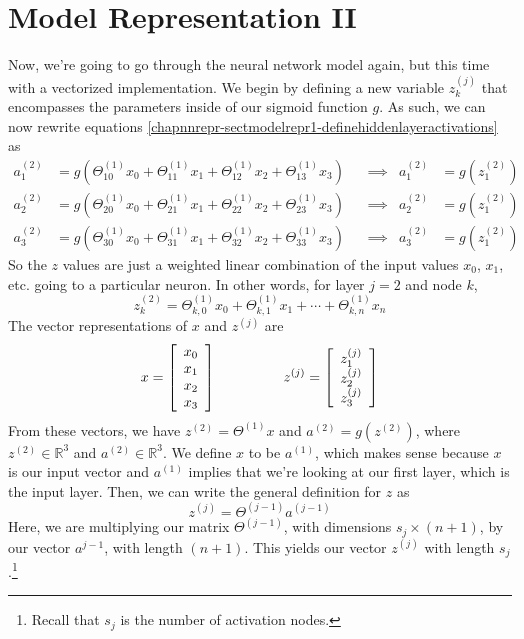 \section{Model Representation II}
Now, we're going to go through the neural network model again, but this time with a vectorized implementation. We begin by defining a new variable $z_k^{(j)}$ that encompasses the parameters inside of our sigmoid function $g$. As such, we can now rewrite equations \ref{chapnnrepr-sectmodelrepr1-definehiddenlayeractivations} as
\begin{align*}
a_1^{(2)} &= g\left(	\Theta_{10}^{(1)} x_0 + \Theta_{11}^{(1)} x_1 + \Theta_{12}^{(1)} x_2 + \Theta_{13}^{(1)} x_3   	\right) & &\implies &  a_1^{(2)} &= g\left(z_1^{(2)}\right) \\
a_2^{(2)} &= g\left(	\Theta_{20}^{(1)} x_0 + \Theta_{21}^{(1)} x_1 + \Theta_{22}^{(1)} x_2 + \Theta_{23}^{(1)} x_3   	\right) & &\implies &  a_2^{(2)} &= g\left(z_1^{(2)}\right) \\
a_3^{(2)} &= g\left(	\Theta_{30}^{(1)} x_0 + \Theta_{31}^{(1)} x_1 + \Theta_{32}^{(1)} x_2 + \Theta_{33}^{(1)} x_3   	\right) & &\implies &  a_3^{(2)} &= g\left(z_1^{(2)}\right)
\end{align*}
So the $z$ values are just a weighted linear combination of the input values $x_0$, $x_1$, etc. going to a particular neuron. In other words, for layer $j=2$ and node $k$, 
\begin{equation}
z_k^{(2)} = \Theta_{k, 0}^{(1)} x_0 + \Theta_{k, 1}^{(1)} x_1 + \cdots + \Theta_{k, n}^{(1)} x_n
\end{equation}
The vector representations of $x$ and $z^{(j)}$ are
$$
x = \left[\begin{array}{c} x_0 \\ x_1 \\ x_2 \\ x_3 \end{array}\right] ~~\mbox{ \;\;\;\;\;\;\;\;\;\; }~~ z^{(j)} = \left[\begin{array}{c} z_1^{(j)} \\ z_2^{(j)} \\ z_3^{(j)} \end{array}\right]
$$
From these vectors, we have $z^{(2)} = \Theta^{(1)} x$ and $a^{(2)} = g\left(z^{(2)}\right)$, where $z^{(2)} \in \mathbb{R}^3$ and $a^{(2)} \in \mathbb{R}^3$. We define $x$ to be $a^{(1)}$, which makes sense because $x$ is our input vector and $a^{(1)}$ implies that we're looking at our first layer, which is the input layer. Then, we can write the general definition for $z$ as
\begin{equation}
z^{(j)} = \Theta^{(j-1)} a^{(j-1)}
\end{equation}
Here, we are multiplying our matrix $\Theta^{(j-1)}$, with dimensions $s_j \times (n+1)$, by our vector $a^{j-1}$, with length $(n+1)$. This yields our vector $z^{(j)}$ with length $s_j$.\footnote{Recall that $s_j$ is the number of activation nodes.} 

